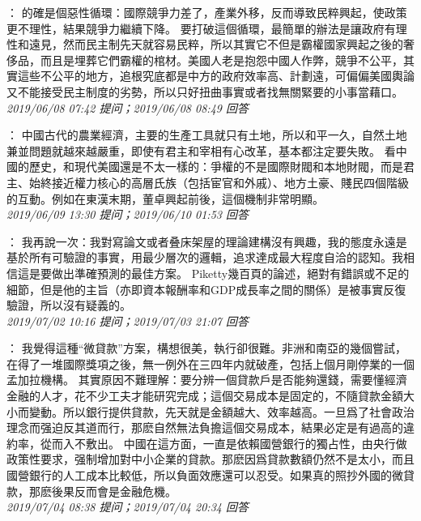 \documentclass[twocolumn]{ctexart}
\begin{document}
：
的確是個惡性循環：國際競爭力差了，產業外移，反而導致民粹興起，使政策更不理性，結果競爭力繼續下降。
要打破這個循環，最簡單的辦法是讓政府有理性和遠見，然而民主制先天就容易民粹，所以其實它不但是霸權國家興起之後的奢侈品，而且是埋葬它們霸權的棺材。美國人老是抱怨中國人作弊，競爭不公平，其實這些不公平的地方，追根究底都是中方的政府效率高、計劃遠，可偏偏美國輿論又不能接受民主制度的劣勢，所以只好扭曲事實或者找無關緊要的小事當藉口。
\\

\textit{\hfill\noindent\small 2019/06/08 07:42 提问；2019/06/08 08:49 回答}

：
中國古代的農業經濟，主要的生產工具就只有土地，所以和平一久，自然土地兼並問題就越來越嚴重，即使有君主和宰相有心改革，基本都注定要失敗。
看中國的歷史，和現代美國還是不太一樣的：爭權的不是國際財閥和本地財閥，而是君主、始終接近權力核心的高層氏族（包括宦官和外戚）、地方土豪、賤民四個階級的互動。例如在東漢末期，董卓興起前後，這個機制非常明顯。
\\

\textit{\hfill\noindent\small 2019/06/09 13:30 提问；2019/06/10 01:53 回答}

：
我再說一次：我對寫論文或者叠床架屋的理論建構沒有興趣，我的態度永遠是基於所有可驗證的事實，用最少層次的邏輯，追求達成最大程度自洽的認知。我相信這是要做出準確預測的最佳方案。
Piketty幾百頁的論述，絕對有錯誤或不足的細節，但是他的主旨（亦即資本報酬率和GDP成長率之間的關係）是被事實反復驗證，所以沒有疑義的。
\\

\textit{\hfill\noindent\small 2019/07/02 10:16 提问；2019/07/03 21:07 回答}

：
我覺得這種“微貸款”方案，構想很美，執行卻很難。非洲和南亞的幾個嘗試，在得了一堆國際獎項之後，無一例外在三四年内就破產，包括上個月剛停業的一個孟加拉機構。
其實原因不難理解：要分辨一個貸款戶是否能夠還錢，需要懂經濟金融的人才，花不少工夫才能研究完成；這個交易成本是固定的，不隨貸款金額大小而變動。所以銀行提供貸款，先天就是金額越大、效率越高。一旦爲了社會政治理念而强迫反其道而行，那麽自然無法負擔這個交易成本，結果必定是有過高的違約率，從而入不敷出。
中國在這方面，一直是依賴國營銀行的獨占性，由央行做政策性要求，强制增加對中小企業的貸款。那麽因爲貸款數額仍然不是太小，而且國營銀行的人工成本比較低，所以負面效應還可以忍受。如果真的照抄外國的微貸款，那麽後果反而會是金融危機。
\\

\textit{\hfill\noindent\small 2019/07/04 08:38 提问；2019/07/04 20:34 回答}
\end{document}
